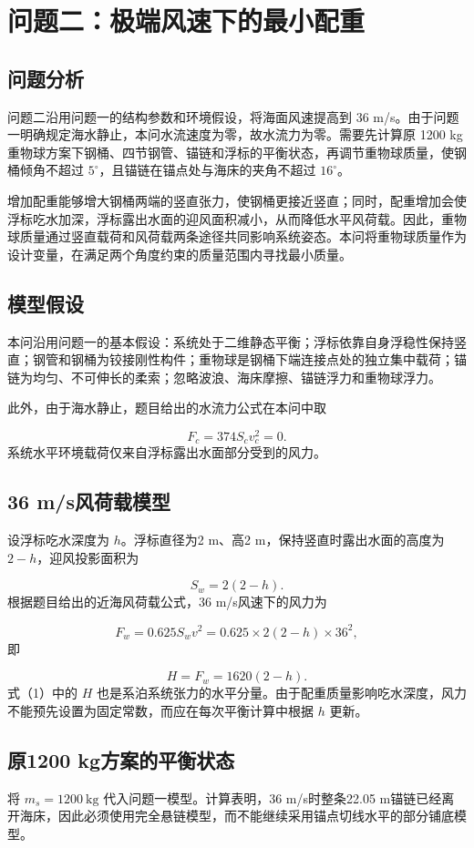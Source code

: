 \documentclass[UTF8,zihao=-4,a4paper,fontset=fandol]{ctexart}
\begin{document}
\section{问题二：极端风速下的最小配重}
\subsection{问题分析}
问题二沿用问题一的结构参数和环境假设，将海面风速提高到 36 m/s。由于问题一明确规定海水静止，本问水流速度为零，故水流力为零。需要先计算原 1200 kg 重物球方案下钢桶、四节钢管、锚链和浮标的平衡状态，再调节重物球质量，使钢桶倾角不超过 \(5^\circ\)，且锚链在锚点处与海床的夹角不超过 \(16^\circ\)。

增加配重能够增大钢桶两端的竖直张力，使钢桶更接近竖直；同时，配重增加会使浮标吃水加深，浮标露出水面的迎风面积减小，从而降低水平风荷载。因此，重物球质量通过竖直载荷和风荷载两条途径共同影响系统姿态。本问将重物球质量作为设计变量，在满足两个角度约束的质量范围内寻找最小质量。

\subsection{模型假设}
本问沿用问题一的基本假设：系统处于二维静态平衡；浮标依靠自身浮稳性保持竖直；钢管和钢桶为铰接刚性构件；重物球是钢桶下端连接点处的独立集中载荷；锚链为均匀、不可伸长的柔索；忽略波浪、海床摩擦、锚链浮力和重物球浮力。

此外，由于海水静止，题目给出的水流力公式在本问中取

\[
F_c=374S_cv_c^2=0.
\]
系统水平环境载荷仅来自浮标露出水面部分受到的风力。

\subsection{36 m/s风荷载模型}
设浮标吃水深度为 \(h\)。浮标直径为2 m、高2 m，保持竖直时露出水面的高度为 \(2-h\)，迎风投影面积为

\[
S_w=2(2-h).
\]
根据题目给出的近海风荷载公式，36 m/s风速下的风力为

\[
F_w=0.625S_wv^2
=0.625\times2(2-h)\times36^2,
\]
即

\[
H=F_w=1620(2-h). \tag{1}
\]
式（1）中的 \(H\) 也是系泊系统张力的水平分量。由于配重质量影响吃水深度，风力不能预先设置为固定常数，而应在每次平衡计算中根据 \(h\) 更新。

\subsection{原1200 kg方案的平衡状态}
将 \(m_s=1200\ \mathrm{kg}\) 代入问题一模型。计算表明，36 m/s时整条22.05 m锚链已经离开海床，因此必须使用完全悬链模型，而不能继续采用锚点切线水平的部分铺底模型。
\end{document}
